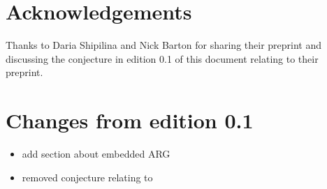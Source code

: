 \documentclass{article}
\begin{document}
\section{Acknowledgements}

Thanks to Daria Shipilina and Nick Barton for sharing their preprint
\cite{shipilina_origin_2022} and discussing the conjecture in edition
0.1 of this document relating to their preprint.

\section{Changes from edition 0.1}

\begin{itemize}
\tightlist
\item
  add section about embedded ARG
\item
  removed conjecture relating to \cite{shipilina_origin_2022}
\end{itemize}
\end{document}
